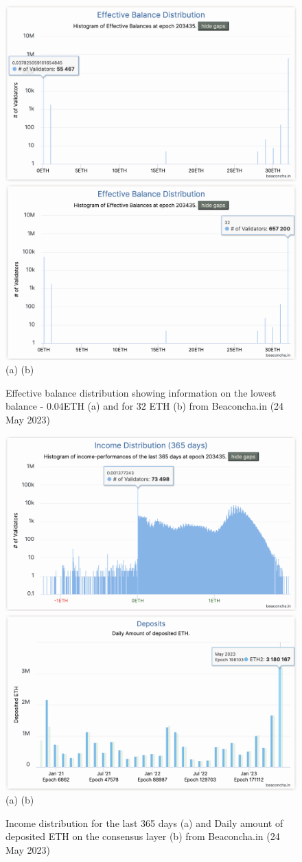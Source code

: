 \documentclass[UTF8]{article}
\begin{document}
{\begin{figure}[htbp]
\begin{center}
\includegraphics[width=0.48\linewidth]{images/bchart9a}
\includegraphics[width=0.48\linewidth]{images/bchart9} \\
(a)\hspace{160pt}        (b)\\
\caption{Effective balance distribution showing information on the lowest balance - 0.04ETH (a) and for 32 ETH (b) from Beaconcha.in (24 May 2023)}
\label{fig:chart9}
\end{center}
\end{figure}

\begin{figure}[htbp]
\begin{center}
\includegraphics[width=0.48\linewidth]{images/bchart10}
\includegraphics[width=0.48\linewidth]{images/bchart11a} \\
(a)\hspace{160pt}        (b)\\
\caption{Income distribution for the last 365 days (a) and Daily amount of deposited ETH on the consensus layer (b) from Beaconcha.in (24 May 2023)}
\label{fig:chart10}
\end{center}
\end{figure}


}
\end{document}
